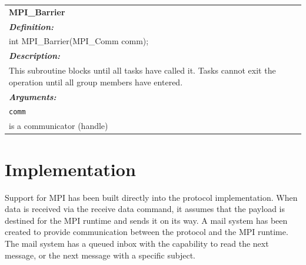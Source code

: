 \begin{longtable}{|p{5.5in}|}
\hline

\vspace{-0.8cm}

\LARGE{\bfseries{MPI\_Barrier}} \\

\vspace{-0.3cm}

\emph{\bfseries{Definition: }} \\
int MPI\_Barrier(MPI\_Comm comm); \\
\vspace{-0.3cm}

\emph{\bfseries{Description: }} \\
This subroutine blocks until all tasks have called it. Tasks cannot exit the operation until all group members have entered. \\
\vspace{-0.3cm}

\emph{\bfseries{Arguments: }} \\
\lstinline$comm$\\
\hspace{0.5cm}     is a communicator (handle)\\
\hline
\end{longtable}

\section{Implementation}\label{sec:api:implementation}

Support for MPI has been built directly into the protocol implementation. When data is received via the receive data command, it assumes that the payload is destined for the MPI runtime and sends it on its way. A mail system has been created to provide communication between the protocol and the MPI runtime. The mail system has a queued inbox with the capability to read the next message, or the next message with a specific subject. 

